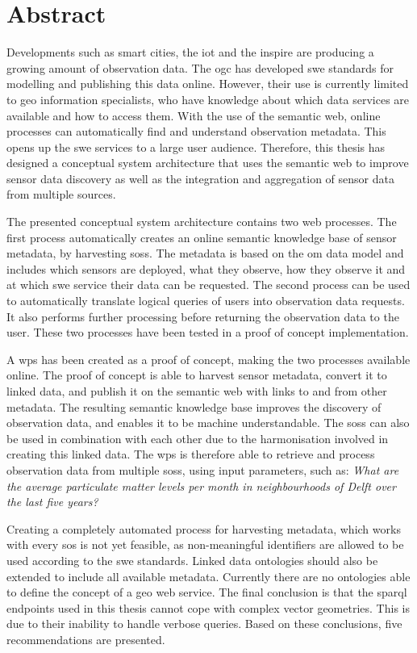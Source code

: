 
\chapter*{Abstract}


Developments such as smart cities, the \acf*{iot} and the \ac*{inspire} are producing a growing amount of observation data. The \ac*{ogc} has developed \ac*{swe} standards for modelling and publishing this data online. However, their use is currently limited to geo information specialists, who have knowledge about which data services are available and how to access them. With the use of the semantic web, online processes can automatically find and understand observation metadata. This opens up the \acs*{swe} services to a large user audience. Therefore, this thesis has designed a conceptual system architecture that uses the semantic web to improve sensor data discovery as well as the integration and aggregation of sensor data from multiple sources.

The presented conceptual system architecture contains two web processes. The first process automatically creates an online semantic knowledge base of sensor metadata, by harvesting \aclp*{sos}. The metadata is based on the \acf*{om} data model and includes which sensors are deployed, what they observe, how they observe it and at which \acs*{swe} service their data can be requested. The second process can be used to automatically translate logical queries of users into observation data requests. It also performs further processing before returning the observation data to the user. These two processes have been tested in a proof of concept implementation.

A \ac*{wps} has been created as a proof of concept, making the two processes available online. The proof of concept is able to harvest sensor metadata, convert it to linked data, and publish it on the semantic web with links to and from other metadata. The resulting semantic knowledge base improves the discovery of observation data, and enables it to be machine understandable. The \aclp*{sos} can also be used in combination with each other due to the harmonisation involved in creating this linked data. The \acs*{wps} is therefore able to retrieve and process observation data from multiple \aclp*{sos}, using input parameters, such as: \textit{What are the average particulate matter levels per month in neighbourhoods of Delft over the last five years?}  
 
Creating a completely automated process for harvesting metadata, which works with every \acl*{sos} is not yet feasible, as non-meaningful identifiers are allowed to be used according to the \acs*{swe} standards. Linked data ontologies should also be extended to include all available metadata. Currently there are no ontologies able to define the concept of a geo web service. The final conclusion is that the \acs*{sparql} endpoints used in this thesis cannot cope with complex vector geometries. This is due to their inability to handle verbose queries. Based on these conclusions, five recommendations are presented.